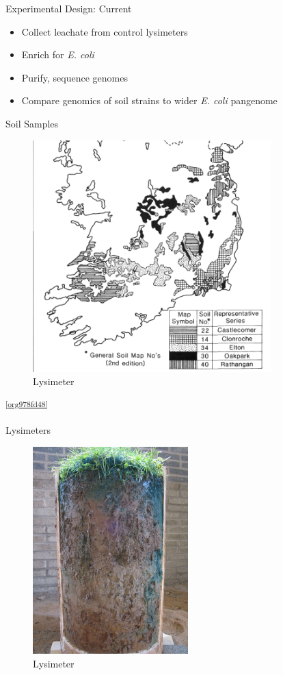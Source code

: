 \documentclass[17pt,aspectratio=169]{beamer}
\begin{document}
\begin{frame}[label={sec:org06ae09a}]{Experimental Design: Current}
\begin{itemize}
\item Collect leachate from control lysimeters
\item Enrich for \emph{E. coli}
\item Purify, sequence genomes
\item Compare genomics of soil strains to wider \emph{E. coli} pangenome
\end{itemize}
\end{frame}

\begin{frame}[label={sec:org9b51ff3}]{Soil Samples}
\begin{figure}[htbp]
\centering
\includegraphics[width=.55\textwidth]{./lys_photos/RyanFanning1.png}
\caption{\label{fig:org7a831f6}
Lysimeter}
\end{figure}
\textsuperscript{\ref{org978fd48}}
\end{frame}

\begin{frame}[label={sec:orge15f88d}]{Lysimeters}
\begin{figure}[htbp]
\centering
\includegraphics[width=6cm]{./lys_photos/rath2.jpg}
\caption{\label{fig:org3d3da45}
Lysimeter}
\end{figure}
\end{frame}
\end{document}
